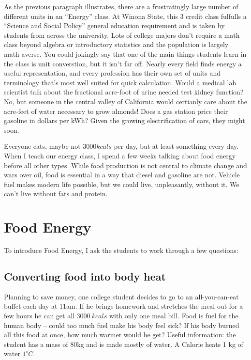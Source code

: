 \documentclass[12pt]{iopart}
\begin{document}
As the previous paragraph illustrates, there are a frustratingly large number of different units in an ``Energy'' class.  At Winona State, this 3 credit class fulfulls a ``Science and Social Policy'' general education requirement and is taken by students from across the university.   Lots of college majors don't require a math class beyond algebra or introductory statistics and the population is largely math-averse. You could jokingly say that one of the main things students learn in the class is unit converstion, but it isn't far off.  Nearly every field finds energy a useful representation, and every profession has their own set of units and terminology that's most well suited for quick calculation.  Would a medical lab scientist talk about the fractional acre-foot of urine needed test kidney function?  No, but someone in the central valley of California would certianly care about the acre-feet of water necessary to grow almonds!  Does a gas station price their gasoline in dollars per kWh? Given the growing electrification of cars, they might soon.

Everyone eats, maybe not $3000 kcals$ per day, but at least something every day.  When I teach our energy class, I spend a few weeks talking about food energy before all other types.  While food production is not central to climate change and wars over oil, food is essential in a way that diesel and gasoline are not.  Vehicle fuel makes modern life possible, but we could live, unpleasantly, without it.  We can't live without fats and protein.  

\section{Food Energy}

To introduce Food Energy, I ask the students to work through a few questions:

\subsection{Converting food into body heat}
Planning to save money, one college student decides to go to an all-you-can-eat buffet each day at 11am.  If he brings homework and stretches the meal out for a few hours he can get all $3000~kcals$ with only one meal bill.  Food is fuel for the human body -- could too much fuel make his body feel sick? If his body burned all this food at once, how much warmer would he get? 
Useful information: the student has a mass of 80kg and is made mostly of water.  A Calorie heats 1 kg of water $1^{\circ}C$. 
\end{document}
